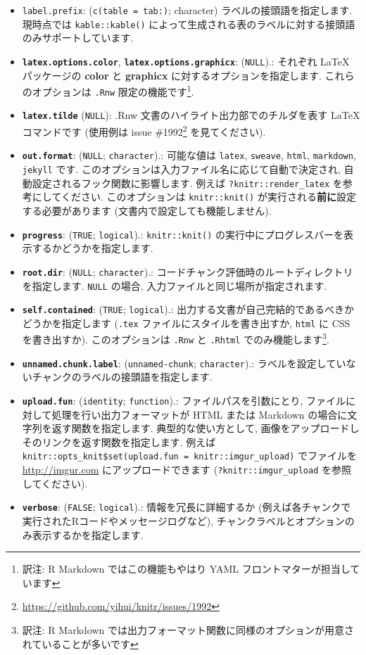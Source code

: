 \documentclass[
  11pt,
  lualatex,ja=standard,jafont=noto]{bxjsreport}
\renewcommand{\href}[2]{#2\footnote{\url{#1}}}
\begin{document}
\begin{itemize}
\item
  \texttt{label.prefix}: (\texttt{c(table = \textquotesingle{}tab:\textquotesingle{})}; character) ラベルの接頭語を指定します. 現時点では \texttt{kable::kable()} によって生成される表のラベルに対する接頭語のみサポートしています.
\item
  \textbf{\texttt{latex.options.color}}, \textbf{\texttt{latex.options.graphicx}}: (\texttt{NULL}).: それぞれ LaTeX パッケージの \textbf{color} と \textbf{graphicx} に対するオプションを指定します. これらのオプションは \texttt{.Rnw} 限定の機能です\footnote{訳注: R Markdown ではこの機能もやはり YAML フロントマターが担当しています}.
\item
  \textbf{\texttt{latex.tilde}} (\texttt{NULL}): .Rnw 文書のハイライト出力部でのチルダを表す LaTeX コマンドです (使用例は issue \href{https://github.com/yihui/knitr/issues/1992}{\#1992} を見てください).
\item
  \textbf{\texttt{out.format}}: (\texttt{NULL}; \texttt{character}).: 可能な値は \texttt{latex}, \texttt{sweave}, \texttt{html}, \texttt{markdown}, \texttt{jekyll} です. このオプションは入力ファイル名に応じて自動で決定され, 自動設定されるフック関数に影響します. 例えば \texttt{?knitr::render\_latex} を参考にしてください. このオプションは \texttt{knitr::knit()} が実行される\textbf{前に}設定する必要があります (文書内で設定しても機能しません).
\item
  \textbf{\texttt{progress}}: (\texttt{TRUE}; \texttt{logical}).: \texttt{knitr::knit()} の実行中にプログレスバーを表示するかどうかを指定します.
\item
  \textbf{\texttt{root.dir}}: (\texttt{NULL}; \texttt{character}).: コードチャンク評価時のルートディレクトリを指定します. \texttt{NULL} の場合, 入力ファイルと同じ場所が指定されます.
\item
  \textbf{\texttt{self.contained}}: (\texttt{TRUE}; \texttt{logical}).: 出力する文書が自己完結的であるべきかどうかを指定します (\texttt{.tex} ファイルにスタイルを書き出すか, \texttt{html} に CSS を書き出すか). このオプションは \texttt{.Rnw} と \texttt{.Rhtml} でのみ機能します\footnote{訳注: R Markdown では出力フォーマット関数に同様のオプションが用意されていることが多いです}.
\item
  \textbf{\texttt{unnamed.chunk.label}}: (\texttt{unnamed-chunk}; \texttt{character}).: ラベルを設定していないチャンクのラベルの接頭語を指定します.
\item
  \textbf{\texttt{upload.fun}}: (\texttt{identity}; \texttt{function}).: ファイルパスを引数にとり, ファイルに対して処理を行い出力フォーマットが HTML または Markdown の場合に文字列を返す関数を指定します. 典型的な使い方として, 画像をアップロードしそのリンクを返す関数を指定します. 例えば \texttt{knitr::opts\_knit\$set(upload.fun = knitr::imgur\_upload)} でファイルを \url{http://imgur.com} にアップロードできます (\texttt{?knitr::imgur\_upload} を参照してください).
\item
  \textbf{\texttt{verbose}}: (\texttt{FALSE}; \texttt{logical}).: 情報を冗長に詳細するか (例えば各チャンクで実行されたRコードやメッセージログなど), チャンクラベルとオプションのみ表示するかを指定します.
\end{itemize}

\backmatter



\printbibliography


\printindex
\end{document}
